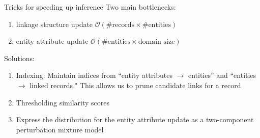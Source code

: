 \documentclass[compress]{beamer}
\newcommand{\1}[1]{\mathbb{I}\!\left[#1\right]} %
\theoremstyle{plain}
\begin{document}
\begin{frame}{Tricks for speeding up inference}
  Two main bottlenecks:
  \begin{enumerate}
    \item linkage structure update 
    $\mathcal{O}(\text{\# records} \times \text{\# entities})$ 
    \item entity attribute update 
    $\mathcal{O}(\text{\# entities} \times \text{domain size})$   \end{enumerate}
  
   \vspace*{2em}
   
  \pause
   Solutions:
   \begin{enumerate}
      \item Indexing: Maintain indices from ``entity attributes $\to$ entities'' and 
      ``entities $\to$ linked records." This allows us to prune candidate links for a record
   \item Thresholding similarity scores
    \item Express the distribution for the entity attribute update as a 
      two-component perturbation mixture model
   \end{enumerate}
   \end{frame}



\end{document}

